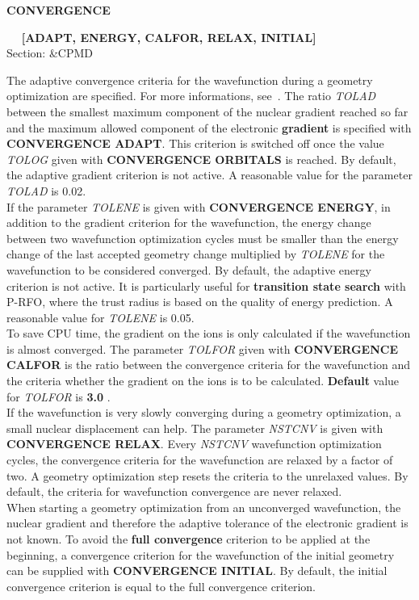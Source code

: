 \documentclass[twoside,10pt,titlepage,a4paper]{article}
\newcommand{\reflabel}[1]{\hypertarget{#1}}
\newcommand{\reflabel}[1]{\label{#1}}
\newcommand{\keyword}[5]{%
\vspace{1.0cm}
\begin{minipage}{15cm}
\reflabel{#1}{\textbf{\large #1}}%
\index{#1}%
\ \textbf{#2}%
\ \textbf{#3}%
\ \textit{#4}%
     \hfill\\\smallskip
     {Section: #5}
     \hfill\\\smallskip\vskip 10pt
\end{minipage}
}%
\newcommand{\desc}[1]{%
   \hspace*{\fill} \parbox{130mm}{\sloppy
                          {#1}%
                             }
     \hfill\\\smallskip
   }%
\newcommand{\desc}[1]{#1\vspace{1ex}}
\newcommand{\defaultvalue}[1]{%
  \textbf{#1}
}
\begin{document}
\keyword{CONVERGENCE}{}{[ADAPT, ENERGY, CALFOR, RELAX, INITIAL]}{}{\&CPMD}
  \desc{The adaptive convergence criteria for the wavefunction during a
    geometry optimization are specified. For more informations,
    see~\cite{LSCAL}. The ratio {\sl TOLAD} between the smallest maximum
    component of the nuclear gradient reached so far and the maximum allowed
    component of the electronic {\bf gradient} is specified with {\bf
    CONVERGENCE ADAPT}. This criterion is switched off once the value {\sl
    TOLOG} given with {\bf CONVERGENCE ORBITALS} is reached. By default, the
    adaptive gradient criterion is not active. A reasonable value for the
    parameter {\sl TOLAD} is 0.02.\\
%
    If the parameter {\sl TOLENE} is given with {\bf CONVERGENCE ENERGY}, in
    addition to the gradient criterion for the wavefunction, the energy change
    between two wavefunction optimization cycles must be smaller than the
    energy change of the last accepted geometry change multiplied by {\sl
    TOLENE} for the wavefunction to be considered converged. By default, the
    adaptive energy criterion is not active. It is particularly useful for {\bf
    transition state search} with P-RFO, where the trust radius is based on the
    quality of energy prediction. A reasonable value for {\sl TOLENE} is
    0.05.\\
%
    To save CPU time, the gradient on the ions is only calculated if the
    wavefunction is almost converged. The parameter {\sl TOLFOR} given with
    {\bf CONVERGENCE CALFOR} is the ratio between the convergence criteria for
    the wavefunction and the criteria whether the gradient on the ions is to be
    calculated. \textbf{Default} value for {\sl TOLFOR} is
    \defaultvalue{3.0}.\\
%
    If the wavefunction is very slowly converging during a geometry
    optimization, a small nuclear displacement can help. The parameter {\sl
    NSTCNV} is given with {\bf CONVERGENCE RELAX}. Every {\sl NSTCNV}
    wavefunction optimization cycles, the convergence criteria for the
    wavefunction are relaxed by a factor of two. A geometry optimization step
    resets the criteria to the unrelaxed values. By default, the criteria for
    wavefunction convergence are never relaxed.\\
%
    When starting a geometry optimization from an unconverged wavefunction, the
    nuclear gradient and therefore the adaptive tolerance of the electronic
    gradient is not known. To avoid the {\bf full convergence} criterion to be
    applied at the beginning, a convergence criterion for the wavefunction of
    the initial geometry can be supplied with {\bf CONVERGENCE INITIAL}.
    By default, the initial convergence criterion is equal to the full
    convergence criterion.}
\end{document}
